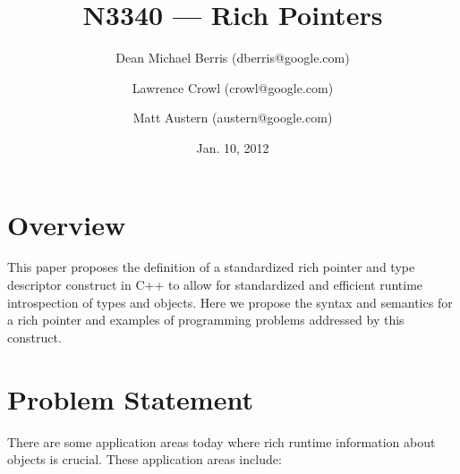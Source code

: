 \documentclass[10pt,a4paper]{article}
\title{N3340 --- Rich Pointers}
\author{Dean Michael Berris (dberris@google.com) \and Lawrence Crowl
(crowl@google.com) \and Matt Austern (austern@google.com)}
\date{Jan. 10, 2012}
\begin{document}
\maketitle
\tableofcontents
\section{Overview}

This paper proposes the definition of a standardized rich pointer and type
descriptor construct in C++ to allow for standardized and efficient runtime
introspection of types and objects. Here we propose the syntax and semantics for
a rich pointer and examples of programming problems addressed by this construct.

\section{Problem Statement}

There are some application areas today where rich runtime information about
objects is crucial.  These application areas include:
\end{document}
